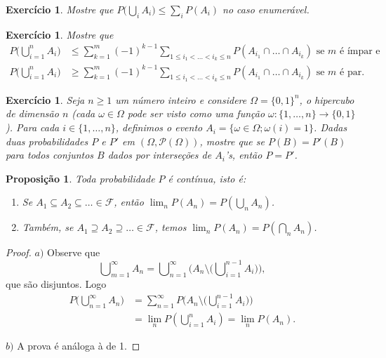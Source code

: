 \documentclass[reqno, final]{book}
\newcommand*\1{\mathds{1}}
\newtheorem{proposition}[theorem]{Proposição}
\newtheorem{exercise}[example]{Exercício}
\DeclareMathOperator*{\mcup}{{\textstyle \bigcup}}
\DeclareMathOperator*{\mcap}{{\textstyle \bigcap}}
\begin{document}
\begin{exercise}
  Mostre que $P\big(\mcup\nolimits_i A_i\big) \leq \sum_i P(A_i)$ no caso enumerável.
\end{exercise}

\begin{exercise}
  Mostre que
  \begin{equation*}
    \begin{split}
      P\big( \mcup\nolimits_{i=1}^n A_i \big) & \leq \sum\limits_{k = 1}^m (-1)^{k-1} \sum\limits_{1 \leq i_1 < \dots < i_k \leq n} P(A_{i_1} \cap \dots \cap A_{i_k}) \text{ se $m$ é ímpar e}\\
      P\big( \mcup\nolimits_{i=1}^n A_i \big) & \geq \sum\limits_{k = 1}^m (-1)^{k-1} \sum\limits_{1 \leq i_1 < \dots < i_k \leq n} P(A_{i_1} \cap \dots \cap A_{i_k}) \text{ se $m$ é par.}
    \end{split}
  \end{equation*}
\end{exercise}



\begin{exercise}
  Seja $n \geq 1$ um número inteiro e considere $\Omega = \{0, 1\}^n$, o hipercubo de dimensão $n$ (cada $\omega \in \Omega$ pode ser visto como uma função $\omega:\{1, \dots, n\} \to \{0,1\}$).
  Para cada $i \in \{1, \dots, n\}$, definimos o evento $A_i = \{ \omega \in \Omega; \omega(i) = 1 \}$.
  Dadas duas probabilidades $P$ e $P'$ em $(\Omega, \mathcal{P}(\Omega))$, mostre que se $P(B) = P'(B)$ para todos conjuntos $B$ dados por interseções de $A_i$'s, então $P = P'$.
\end{exercise}

\begin{proposition}
  \label{p:prob_continua}
  Toda probabilidade $P$ é contínua, isto é:
  \begin{enumerate}[\quad a)]
  \item Se $A_1 \subseteq A_2 \subseteq \dots \in \mathcal{F}$, então $\lim_n P(A_n) = P(\mcup\nolimits_n A_n)$.
  \item Também, se $A_1 \supseteq A_2 \supseteq \dots \in \mathcal{F}$, temos $\lim_n P(A_n) = P(\mcap\nolimits_n A_n)$.
  \end{enumerate}
\end{proposition}

\begin{proof}
  $a)$ Observe que
  \begin{equation}
    \mcup_{m = 1}^\infty A_n = \mcup_{n = 1}^\infty \Big( A_n \setminus \big( \mcup_{i=1}^{n-1} A_i \big) \Big),
  \end{equation}
  que são disjuntos.
  Logo
  \begin{equation}
    \begin{split}
      P\big(\mcup\nolimits_{n = 1}^\infty A_n\big) & = \sum_{n = 1}^\infty P\Big( A_n \setminus \big(\mcup\nolimits_{i=1}^{n-1} A_i \big) \Big)\\
      & = \lim_n P({\mcup\nolimits_{i = 1}^n} A_i) = \lim_n P(A_n).
    \end{split}
  \end{equation}

  $b)$ A prova é análoga à de 1.
\end{proof}
\end{document}
